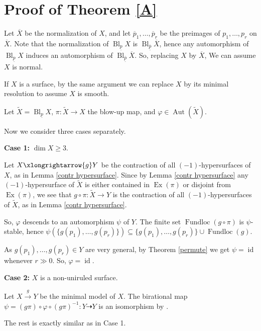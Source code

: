 \documentclass[11pt,letterpaper]{amsart}
\begin{document}
\section{Proof of Theorem \ref{A}}
Let $\overline{X}$ be the normalization of $X$, and let
$\overline{p}_1,\ldots,\overline{p}_r$ be the preimages of
$p_1,\ldots,p_r$ on $\overline{X}$. Note that the normalization of
$\operatorname{Bl}_{\underline{p}}X$ is $\operatorname{Bl}_{\underline{\overline{p}}}\overline{X}$,
hence any automorphism of $\operatorname{Bl}_{\underline{p}}X$ induces an automorphism
of $\operatorname{Bl}_{\overline{\underline{p}}}\overline{X}$. So, replacing $X$ by
$\overline{X}$, We can assume $X$ is normal.

If $X$ is a surface, by the same argument we can replace $X$ by its minimal
resolution to assume $X$ is smooth.

Let $\widetilde{X}=\operatorname{Bl}_{\underline{p}}X$,
$\pi:\widetilde{X}\to X$ the blow-up map, and
$\varphi\in\operatorname{Aut}(\widetilde{X})$.

Now we consider three cases separately.

\noindent\textbf{Case 1:} $\dim X\ge 3$.

Let $X\xlongrightarrow{g}Y$ be the contraction of all $(-1)$-hypersurfaces of
$X$, as in Lemma \ref{contr hypersurface}. Since by Lemma \ref{contr hypersurface} any $(-1)$-hypersurface of
$\widetilde{X}$ is either contained in $\operatorname{Ex}(\pi)$ or disjoint
from $\operatorname{Ex}(\pi)$, we see that
$g\circ\pi:\widetilde{X}\to Y$ is the contraction of all
$(-1)$-hypersurfaces of $\widetilde{X}$, as in Lemma \ref{contr hypersurface}.

So, $\varphi$ descends to an automorphism $\psi$ of $Y$. The finite set $\operatorname{Fundloc}(g\circ\pi)$ is $\psi$-stable, hence
$\psi(\{g(p_1),\ldots,g(p_r)\})\subseteq
\{g(p_1),\ldots,g(p_r)\}\cup\operatorname{Fundloc}(g)$.

As $g(p_1),\ldots,g(p_r)\in Y$ are very general, by Theorem \ref{permute} we get
$\psi=\operatorname{id}$ whenever $r\gg0$. So, $\varphi=\operatorname{id}$.

\medskip

\noindent\textbf{Case 2:} $X$ is a non-uniruled surface.

 Let $X\xrightarrow{g}Y$ be the minimal model of $X$.
The birational map $\psi=(g\pi)\circ\varphi\circ(g\pi)^{-1}:Y\dashrightarrow Y$
is an isomorphism by \cite[Theorem 3.52(2)]{KM}.

The rest is exactly similar as in Case 1.
\end{document}
